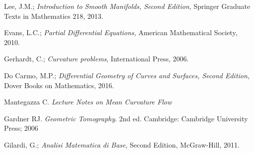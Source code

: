 \documentclass[a4paper, 12pt]{book}
\begin{document}
\begin{thebibliography}{11}
	 Lee, J.M.; {\em Introduction to Smooth Manifolds, Second Edition},  Springer Graduate Texts in Mathematics 218, 2013. 
	
	 Evans, L.C.; {\em Partial Differential Equations},  American Mathematical Society, 2010. 
	
	 Gerhardt, C.; {\em Curvature problems}, International Press, 2006.
	
	 Do Carmo, M.P.; {\em Differential Geometry of Curves and Surfaces, Second Edition},  Dover Books on Mathematics, 2016. 
	
	
	 Mantegazza C. {\em Lecture Notes on Mean Curvature Flow}
	
	
	 Gardner RJ. {\em Geometric Tomography}. 2nd ed. Cambridge: Cambridge University Press; 2006
	
	
	 Gilardi, G.; {\em Analisi Matematica di Base},  Second Edition,  McGraw-Hill, 2011. 
\end{thebibliography}
%
\end{document}
